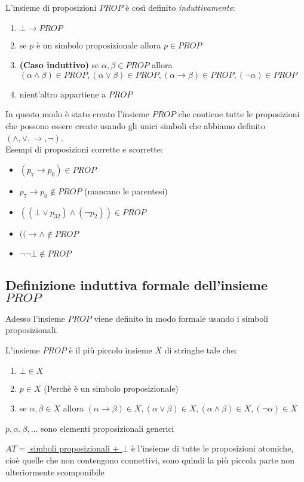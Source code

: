 \documentclass{article}
\theoremstyle{break}
\theoremstyle{break}
\theoremstyle{break}
\theoremstyle{break}
\begin{document}
L'insieme di proposizioni \( PROP \) è così definito \emph{induttivamente}:
\begin{enumerate}
	\item \( \bot \to PROP \)
	\item se \( p \) è un simbolo proposizionale allora \( p \in PROP \)
	\item \textbf{(Caso induttivo)} se \( \alpha, \beta \in PROP \) allora
	      \( (\alpha \wedge \beta ) \in PROP, (\alpha \vee \beta ) \in PROP,
	      (\alpha \to \beta ) \in PROP, (\neg \alpha ) \in PROP \)
	\item nient'altro appartiene a \( PROP \)
\end{enumerate}

In questo modo è stato creato l'insieme \( PROP \) che contiene tutte le proposizioni che possono essere create
usando gli unici simboli che abbiamo definito \( (\wedge, \vee, \to, \neg) \).
\vspace{0.5cm}
\\
Esempi di proposizioni corrette e scorrette:
\begin{itemize}
	\item \( (p_{7} \to p_{0}) \in PROP \)
	\item \( p_{7} \to p_{0} \notin PROP \) (mancano le parentesi)
	\item \( ((\bot \vee p_{32}) \wedge (\neg p_{2})) \in PROP \)
	\item \( ((\to \wedge \notin PROP \)
	\item \( \neg \neg \bot \notin PROP \)
\end{itemize}

\subsection{Definizione induttiva formale dell'insieme \( PROP \)}
Adesso l'insieme \( PROP \) viene definito in modo formale usando i simboli proposizionali.
\begin{definition}
	L'insieme \( PROP \) è il più piccolo insieme \( X \) di stringhe tale che:
	\begin{enumerate}
		\item \( \bot \in X \)
		\item \( p \in X \) (Perchè è un simbolo proposizionale)
		\item se \( \alpha, \beta \in X \) allora \( (\alpha \to \beta ) \in X, (\alpha \vee \beta ) \in X,
		      (\alpha \wedge \beta ) \in X, (\neg \alpha ) \in X \)
	\end{enumerate}
	\( p, \alpha , \beta, \ldots  \) sono elementi proposizionali generici
\end{definition}
\underline{\( AT  = \) simboli proposizionali + \( \bot \)}
è l'insieme di tutte le proposizioni atomiche,
cioè quelle che non contengono connettivi, sono quindi la più piccola parte
non ulteriormente scomponibile
\end{document}
